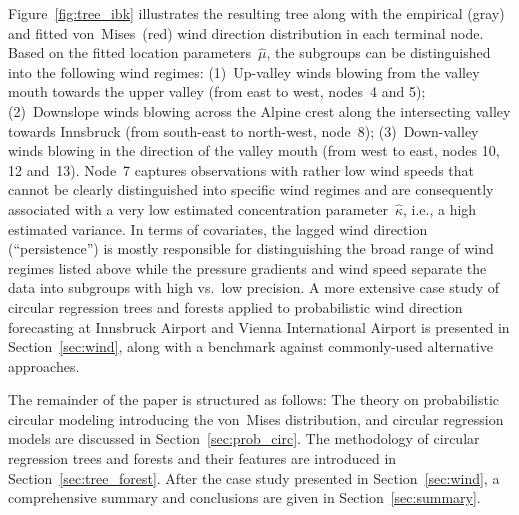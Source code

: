 \documentclass{statsoc}
\begin{document}
Figure~\ref{fig:tree_ibk} illustrates the resulting tree along with the
empirical (gray) and fitted von~Mises~(red) wind direction distribution in each
terminal node. Based on the fitted location parameters~$\hat \mu$, the
subgroups can be distinguished into the following wind regimes: (1)~Up-valley
winds blowing from the valley mouth towards the upper valley (from east to
west, nodes~4 and 5); (2)~Downslope winds blowing across the Alpine crest along
the intersecting valley towards Innsbruck (from south-east to north-west,
node~8); (3)~Down-valley winds blowing in the direction of the valley mouth
(from west to east, nodes 10, 12 and~13). Node~7 captures observations with
rather low wind speeds that cannot be clearly distinguished into specific wind
regimes and are consequently associated with a very low estimated concentration
parameter~$\hat{\kappa}$, i.e., a high estimated variance. In terms of
covariates, the lagged wind direction (``persistence'') is mostly responsible
for distinguishing the broad range of wind regimes listed above while the
pressure gradients and wind speed separate the data into subgroups with high
vs.\ low precision. A more extensive case study of circular regression trees
and forests applied to probabilistic wind direction forecasting at Innsbruck
Airport and Vienna International Airport is presented in
Section~\ref{sec:wind}, along with a benchmark against commonly-used
alternative approaches.

The remainder of the paper is structured as follows: The theory on
probabilistic circular modeling introducing the von~Mises distribution, and
circular regression models are discussed in Section~\ref{sec:prob_circ}. The
methodology of circular regression trees and forests and their features are
introduced in Section~\ref{sec:tree_forest}. After the case study presented in
Section~\ref{sec:wind}, a comprehensive summary and conclusions are given in
Section~\ref{sec:summary}.

\end{document}
